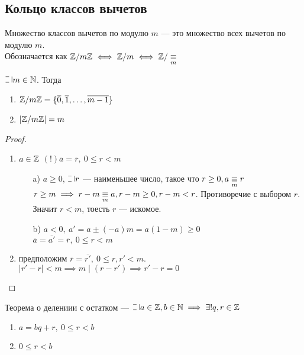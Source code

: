 \begin{normalsize}
\section {Кольцо классов вычетов}

\begin{defn}
    Множество классов вычетов по модулю $m$ --- это множество всех вычетов по модулю $m$.\\
    Обозначается как $\mathbb{Z}/m\mathbb{Z} \iff \mathbb{Z}/m \iff \mathbb{Z}/\underset{m}{\equiv}$
\end{defn}

\begin{theorem}
    $\letus m \in \mathN$. Тогда 
    \begin{enumerate}
        \item $\mathbb{Z}/m\mathbb{Z} = \{\overline{0}, \overline{1}, \ldots, \overline{m-1}\}$
        \item $|\mathbb{Z}/m\mathbb{Z}| = m$ 
    \end{enumerate}
\end{theorem}

\begin{proof}
    \begin{enumerate}
        \item $a \in \mathbb{Z}$ $(!) \overline{a} = \overline{r},~0 \leq r < m$
        \begin{enumerate}
            \item[a)] $a \geq 0$, $\letus r$ --- наименьшее число, такое что $r \geq 0, a \underset{m}{\equiv} r$\\
            $r \geq m \implies r - m \underset{m}{\equiv} a, r - m \geq 0, r - m < r$. Противоречие с выбором $r$.\\
            Значит $r < m$, тоесть $r$ --- искомое.
            \item[b)] $a < 0,~a' = a \pm (-a)m = a(1-m) \geq 0$\\
            $\overline{a} = \overline{a'} = \overline{r},~0 \leq r < m$\\
        \end{enumerate}
        \item предположим $\overline{r} = \overline{r'},~0 \leq r, r' < m$.\\
        $|r' - r| < m \implies m \mid (r - r') \implies r' - r = 0$\\
    \end{enumerate}
\end{proof}

\begin{follow}
    Теорема о делениии с остатком --- $\letus a \in \mathZ, b \in \mathN \implies \exists! q, r \in \mathZ$
    \begin{enumerate}
        \item $a = bq + r,~0 \leq r < b$
        \item $0 \leq r < b$
    \end{enumerate}
\end{follow}


\end{normalsize}

